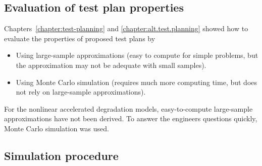 \subsection{Evaluation of test plan properties}

Chapters~\ref{chapter:test-planning} and \ref{chapter:alt.test.planning} 
showed how to evaluate the properties of proposed test plans by 
\begin{itemize}
\item Using large-sample approximations (easy to compute for simple
problems, but the approximation may not be adequate with small samples).
\item Using Monte Carlo simulation (requires much more computing time, but
does not rely on large-sample approximations).
\end{itemize}
For the nonlinear accelerated degradation models, easy-to-compute large-sample
approximations have not been derived. To answer the engineers questions
quickly, Monte Carlo simulation was used.

\subsection{Simulation procedure}

